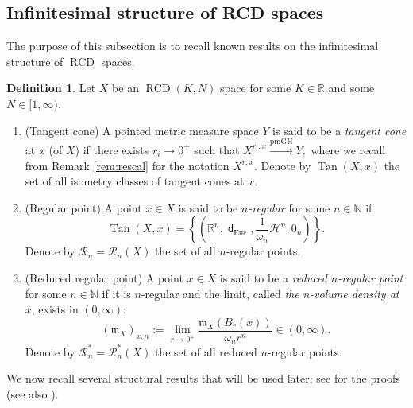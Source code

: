 \documentclass[11pt,reqno]{amsart}
\theoremstyle{definition}
\newtheorem{definition}[theorem]{Definition}
\numberwithin{equation}{section}
\newcommand{\meas}{\mathfrak{m}}
\DeclareMathOperator{\dist}{\mathsf{d}}
\DeclareMathOperator{\Euc}{Euc}
\DeclareMathOperator{\RCD}{RCD}
\DeclareMathOperator{\Tan}{Tan}
\newcommand{\haus}{\mathscr{H}}
\begin{document}
\subsection{Infinitesimal structure of RCD spaces}

 The purpose of this subsection is to recall known results on the infinitesimal structure of $\RCD$ spaces.
\begin{definition}\label{deftange}
Let $X$ be an $\RCD(K, N)$ space for some $K \in \mathbb{R}$ and some $N \in [1, \infty)$.
\begin{enumerate}
    \item{(Tangent cone)} A pointed metric measure space $Y$ is said to be a \textit{tangent cone} at $x$ (of $X$) if there exists $r_i \to 0^+$ such that 
$
X^{r_i, x} \stackrel{\mathrm{pmGH}}{\to} Y,
$
where we recall from Remark \ref{rem:rescal} for the notation $X^{r, x}$. Denote by $\Tan (X, x)$ the set of all isometry classes of tangent cones at $x$.
\item{(Regular point)} A point $x \in X$ is said to be \textit{$n$-regular} for some $n \in \mathbb{N}$ if
\begin{equation*}
\Tan (X, x) =\left\{ \left(\mathbb{R}^n, \dist_{\Euc}, \frac{1}{\omega_n}\haus^n, 0_n\right) \right\}.
\end{equation*}
 Denote by $\mathcal{R}_n=\mathcal{R}_n(X)$ the set of all $n$-regular points. 
 \item{(Reduced regular point)} A point $x \in X$ is said to be a \textit{reduced $n$-regular point} for some $n \in \mathbb{N}$ if it is $n$-regular and 
 the limit, called \textit{the $n$-volume density at $x$}, exists in $(0, \infty)$:
 \begin{equation}\label{RN}
     (\meas_X)_{x, n}:=\lim_{r \to 0^+}\frac{\meas_X(B_r(x))}{\omega_nr^n} \in (0, \infty).
 \end{equation}
 Denote by $\mathcal{R}_n^*=\mathcal{R}_n^*(X)$ the set of all reduced $n$-regular points. 
\end{enumerate}
\end{definition}
We now recall several structural results that will be used later; see \cite{BrueSemola, Deng, DG2, DMR, GPMeasure, KellMondino, Kita} for the proofs (see also \cite{AHPT, AHT}). 
\end{document}
